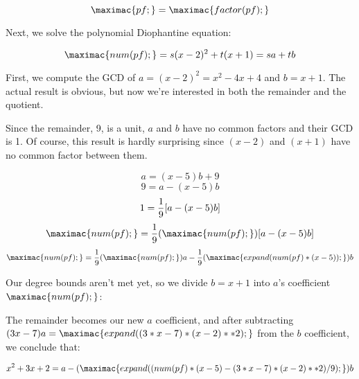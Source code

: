\begin{comment}
Differentiating to obtain $3x^2-6x$.
Computing the GCD of $x^3-3x^2+4$ and $3x^2-6x$:

\sympyc{long_division(x**3-3*x**2+4, 3*x**2-6*x, x)}
\bigskip
\sympyc{long-division(3*x**2-6*x, -2*x+4)}


Thus, $-2x+4$ is a GCD, which we normalize by dividing through by -2
to obtain $x-2$.  We could now proceed by dividing $x^3-3x^2+4$ by
$x-2$ to obtain $x^2-x-2$ (all factors at unit power), compute the GCD
of $x-2$ and $x^2-x-2$ to obtain $x-2$ (all higher factors at unit
power), divide $x^2-x-2$ by $x-2$ to obtain $x+1$ (the unit
square-free factor), and repeat the process (trivially) with $x-2$ to
decide that $x-2$ is the second square-free factor.  Or, we could
shortcut the entire process by noting that since $x-2$ is linear,
it can only be the second square-free factor.  In any event, we conclude that:

\end{comment}

$$\maximac{pf;} = \maximac{factor(pf);}$$

Next, we solve the polynomial Diophantine equation:

$$\maximac{num(pf);} = s(x-2)^2 + t(x+1) = sa+tb$$

First, we compute the GCD of $a=(x-2)^2=x^2-4x+4$ and $b=x+1$.
The actual result is obvious, but now we're interested
in both the remainder and the quotient.


Since the remainder, 9, is a unit, $a$ and $b$ have no common
factors and their GCD is 1.  Of course, this result is hardly
surprising since $(x-2)$ and $(x+1)$
have no common factor between them.

$$a=(x-5)b+9$$
$$9=a-(x-5)b$$
$$1={1\over9}[a-(x-5)b]$$
$$\maximac{num(pf);} = {1\over9}(\maximac{num(pf);})[a-(x-5)b]$$
$$\maximac{num(pf);} = {1\over9}(\maximac{num(pf);})a-{1\over9}(\maximac{expand(num(pf)*(x-5));})b$$

Our degree bounds aren't met yet, so we divide $b=x+1$ into $a$'s coefficient $\maximac{num(pf);}$:


The remainder becomes our new $a$ coefficient,
and after subtracting $(3x-7)a=\maximac{expand((3*x-7)*(x-2)**2);}$ from the $b$ coefficient,
we conclude that:

$$x^2 + 3x + 2 = a - (\maximac{expand((num(pf)*(x-5) - (3*x-7)*(x-2)**2)/9);})b$$

